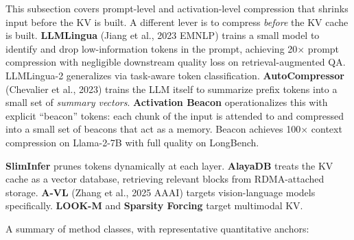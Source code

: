 \documentclass{article}
\begin{document}
This subsection covers prompt-level and activation-level compression that shrinks input before the KV is built. A different lever is to compress \emph{before} the KV cache is built. \textbf{LLMLingua} (Jiang et al., 2023 EMNLP) trains a small model to identify and drop low-information tokens in the prompt, achieving 20× prompt compression with negligible downstream quality loss on retrieval-augmented QA. LLMLingua-2 generalizes via task-aware token classification. \textbf{AutoCompressor} (Chevalier et al., 2023) trains the LLM itself to summarize prefix tokens into a small set of \emph{summary vectors}. \textbf{Activation Beacon} \citep{zhang20242024} operationalizes this with explicit ``beacon'' tokens: each chunk of the input is attended to and compressed into a small set of beacons that act as a memory. Beacon achieves 100× context compression on Llama-2-7B with full quality on LongBench.

\textbf{SlimInfer} \citep{long20252025} prunes tokens dynamically at each layer. \textbf{AlayaDB} \citep{deng20252025} treats the KV cache as a vector database, retrieving relevant blocks from RDMA-attached storage. \textbf{A-VL} (Zhang et al., 2025 AAAI) targets vision-language models specifically. \textbf{LOOK-M} \citep{wan20242024} and \textbf{Sparsity Forcing} \citep{chen20252025} target multimodal KV.

A summary of method classes, with representative quantitative anchors:
\end{document}
